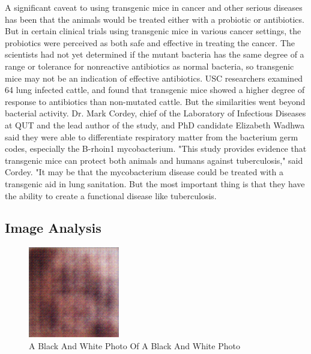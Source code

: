 \documentclass{article}%
\begin{document}
A significant caveat to using transgenic mice in cancer and other serious diseases has been that the animals would be treated either with a probiotic or antibiotics. But in certain clinical trials using transgenic mice in various cancer settings, the probiotics were perceived as both safe and effective in treating the cancer. The scientists had not yet determined if the mutant bacteria has the same degree of a range or tolerance for nonreactive antibiotics as normal bacteria, so transgenic mice may not be an indication of effective antibiotics.\newline%
USC researchers examined 64 lung infected cattle, and found that transgenic mice showed a higher degree of response to antibiotics than non{-}mutated cattle. But the similarities went beyond bacterial activity. Dr. Mark Cordey, chief of the Laboratory of Infectious Diseases at QUT and the lead author of the study, and PhD candidate Elizabeth Wadhwa said they were able to differentiate respiratory matter from the bacterium germ codes, especially the B{-}rhoin1 mycobacterium.\newline%
"This study provides evidence that transgenic mice can protect both animals and humans against tuberculosis," said Cordey. "It may be that the mycobacterium disease could be treated with a transgenic aid in lung sanitation. But the most important thing is that they have the ability to create a functional disease like tuberculosis.

%
\subsection{Image Analysis}%
\label{subsec:ImageAnalysis}%


\begin{figure}[h!]%
\centering%
\includegraphics[width=150px]{500_fake_images/samples_5_82.png}%
\caption{A Black And White Photo Of A Black And White Photo}%
\end{figure}

%
\end{document}
